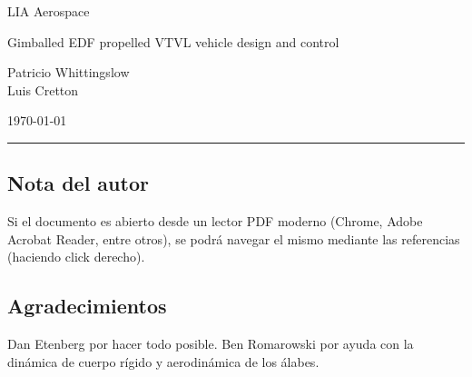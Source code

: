 \documentclass[11pt, titlepage]{article}
\author{Patricio Whittingslow \and Luis Cretton}
\begin{document}
\begin{titlepage}
	
	\centering
	{\small LIA Aerospace \par}
	
	
	\vspace{8cm}
	{\Huge Gimballed EDF propelled VTVL vehicle design and control  \par}
	\vspace{2cm}
	{ \large {
			Patricio Whittingslow \\ Luis Cretton 
		\par}}
	\vspace{4cm}
	\today
	
\end{titlepage}

\begin{abstract}
En este documento se encuentran descriptas las secuencias del diseño, simulación, pruebas, y puesta en marcha de un vehículo autónomo VTVL (Vertical Take-off Vertical Landing). Se desarrolla la elección de un método de propulsión que lograra ensayar el sistema de control a baja escala para luego ser puesto en marcha en un sistema de mayor escala de uso sub-orbital o incluso orbital.


\end{abstract}

\newpage
\tableofcontents
\newpage
\printunsrtglossaries
\vfill
\hrule
\vspace{-1cm}
\subsection*{Nota del autor}
Si el documento es abierto desde un lector PDF moderno (Chrome, Adobe Acrobat Reader, entre otros), se podrá navegar el mismo mediante las referencias (haciendo click derecho).
\newpage












\subsection*{Agradecimientos}
Dan Etenberg por hacer todo posible. Ben Romarowski por ayuda con la dinámica de cuerpo rígido y aerodinámica de los álabes.




% 
%
\end{document}
